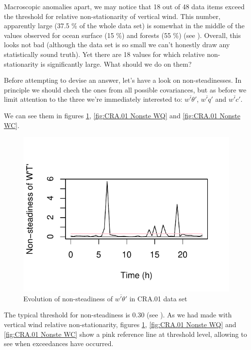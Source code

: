 \documentclass[a4paper,10pt]{book}
\begin{document}
Macroscopic anomalies apart, we may notice that 18 out of 48 data items exceed the threshold for relative non-stationarity of vertical wind. This number, apparently large (37.5 \% of the whole data set) is somewhat in the middle of the values observed for ocean surface (15 \%) and forests (55 \%) (see \cite{Aubinet2012}). Overall, this looks not bad (although the data set is so small we can't honestly draw any statistically sound truth). Yet there are 18 values for which relative non-stationarity is significantly large. What should we do on them?

Before attempting to devise an answer, let's have a look on non-steadinesses. In principle we should chech the ones from all possible covariances, but as before we limit attention to the three we're immediately interested to: $\overline{w'\theta'}$, $\overline{w'q'}$ and $\overline{w'c'}$.

We can see them in figures \ref{fig:CRA.01 Nonste WT}, \ref{fig:CRA.01 Nonste WQ} and \ref{fig:CRA.01 Nonste WC}.

\begin{figure}[htp]
 \centering
 \begin{center}
 \includegraphics[scale=1.1,keepaspectratio=true]{./diagrams/CRA01_WT_NonSte.pdf}
 \end{center}
 \caption{Evolution of non-steadiness of $\overline{w'\theta'}$ in CRA.01 data set}
 \label{fig:CRA.01 Nonste WT}
\end{figure}

The typical threshold for non-steadiness is 0.30 (see \cite{Aubinet2012}). As we had made with vertical wind relative non-stationarity, figures \ref{fig:CRA.01 Nonste WT}, \ref{fig:CRA.01 Nonste WQ} and \ref{fig:CRA.01 Nonste WC} show a pink reference line at threshold level, allowing to see when exceedances have occurred.
\end{document}
